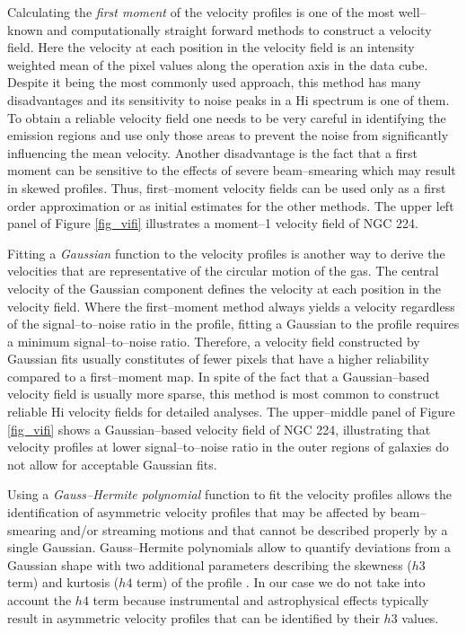 \documentclass[usenatbib,useAMS]{mnras}
\begin{document}
Calculating the {\it first moment } of the velocity profiles is one of
the most well--known and computationally straight forward methods to
construct a velocity field.  Here the velocity at each position in the
velocity field is an intensity weighted mean of the pixel values along
the operation axis in the data cube.  Despite it being the most commonly
used approach, this method has many disadvantages and its sensitivity to
noise peaks in a H{\sc i} spectrum is one of them.  To obtain a reliable
velocity field one needs to be very careful in identifying the emission
regions and use only those areas to prevent the noise from significantly
influencing the mean velocity.  Another disadvantage is the fact that a
first moment can be sensitive to the effects of severe beam--smearing
which may result in skewed profiles.  Thus, first--moment velocity
fields can be used only as a first order approximation or as initial
estimates for the other methods.  The upper left panel of Figure
\ref{fig_vifi} illustrates a moment--1 velocity field of NGC 224. 

Fitting a {\it Gaussian } function to the velocity profiles is another
way to derive the velocities that are representative of the circular
motion of the gas.  The central velocity of the Gaussian component
defines the velocity at each position in the velocity field.  Where the
first--moment method always yields a velocity regardless of the
signal--to--noise ratio in the profile, fitting a Gaussian to the
profile requires a minimum signal--to--noise ratio.  Therefore, a
velocity field constructed by Gaussian fits usually constitutes of fewer
pixels that have a higher reliability compared to a first--moment map. 
In spite of the fact that a Gaussian--based velocity field is usually
more sparse, this method is most common to construct reliable H{\sc i}
velocity fields for detailed analyses.  The upper--middle panel of
Figure \ref{fig_vifi} shows a Gaussian--based velocity field of NGC 224,
illustrating that velocity profiles at lower signal--to--noise ratio in
the outer regions of galaxies do not allow for acceptable Gaussian fits. 

Using a {\it Gauss--Hermite polynomial} function to fit the velocity
profiles allows the identification of asymmetric velocity profiles that
may be affected by beam--smearing and/or streaming motions and that
cannot be described properly by a single Gaussian.  Gauss--Hermite
polynomials allow to quantify deviations from a Gaussian shape with two
additional parameters describing the skewness ($h3$ term) and kurtosis
($h4$ term) of the profile \citep{hermite}.  In our case we do not take
into account the $h4$ term because instrumental and astrophysical
effects typically result in asymmetric velocity profiles that can be
identified by their $h3$ values. 
\end{document}
